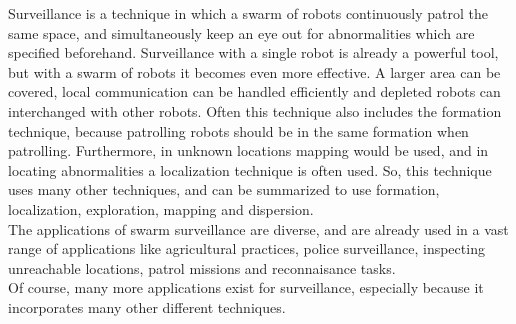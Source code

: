 
Surveillance is a technique in which a swarm of robots continuously patrol the same space, and simultaneously keep an eye out for abnormalities which are specified beforehand. 
Surveillance with a single robot is already a powerful tool, but with a swarm of robots it becomes even more effective. 
A larger area can be covered, local communication can be handled efficiently and depleted robots can interchanged with other robots. 
Often this technique also includes the formation technique, because patrolling robots should be in the same formation when patrolling. 
Furthermore, in unknown locations mapping would be used, and in locating abnormalities a localization technique is often used.
So, this technique uses many other techniques, and can be summarized to use formation, localization, exploration, mapping and dispersion.  \\

The applications of swarm surveillance are diverse, and are already used in a vast range of applications like agricultural practices, police surveillance, inspecting unreachable locations, patrol missions and reconnaisance tasks. \cite{Burkle2010} \\
Of course, many more applications exist for surveillance, especially because it incorporates many other different techniques. 
